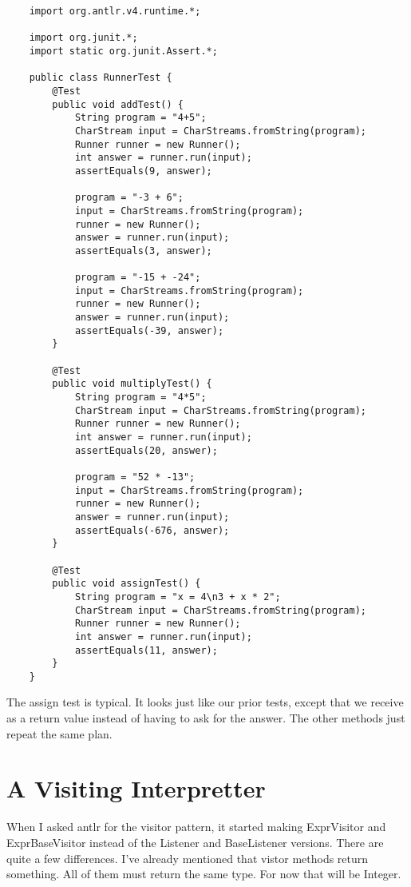 {\footnotesize
\begin{verbatim}
    import org.antlr.v4.runtime.*;
    
    import org.junit.*;
    import static org.junit.Assert.*;
    
    public class RunnerTest {
        @Test
        public void addTest() {
            String program = "4+5";
            CharStream input = CharStreams.fromString(program);
            Runner runner = new Runner();
            int answer = runner.run(input);
            assertEquals(9, answer);
    
            program = "-3 + 6";
            input = CharStreams.fromString(program);
            runner = new Runner();
            answer = runner.run(input);
            assertEquals(3, answer);
    
            program = "-15 + -24";
            input = CharStreams.fromString(program);
            runner = new Runner();
            answer = runner.run(input);
            assertEquals(-39, answer);
        }
    
        @Test
        public void multiplyTest() {
            String program = "4*5";
            CharStream input = CharStreams.fromString(program);
            Runner runner = new Runner();
            int answer = runner.run(input);
            assertEquals(20, answer);
    
            program = "52 * -13";
            input = CharStreams.fromString(program);
            runner = new Runner();
            answer = runner.run(input);
            assertEquals(-676, answer);
        }
    
        @Test
        public void assignTest() {
            String program = "x = 4\n3 + x * 2";
            CharStream input = CharStreams.fromString(program);
            Runner runner = new Runner();
            int answer = runner.run(input);
            assertEquals(11, answer);
        }
    }
\end{verbatim}
}

The assign test is typical. It looks just like our prior tests, except
that we receive as a return value instead of having to ask for the answer.
The other methods just repeat the same plan.

\section{A Visiting Interpretter}

When I asked antlr for the visitor pattern, it started making ExprVisitor
and ExprBaseVisitor instead of the Listener and BaseListener versions. There are
quite a few differences. I've already mentioned that vistor methods
return something. All of them must return the same type. For now that
will be Integer.

